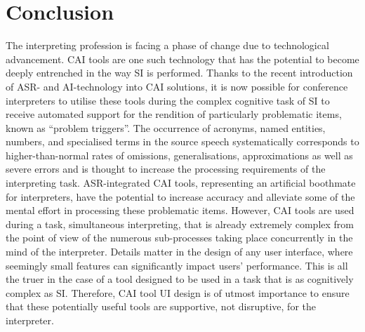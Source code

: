 \chapter{Conclusion}\label{ch:conclusion}
The interpreting profession is facing a phase of change due to technological advancement. CAI tools are one such technology that has the potential to become deeply entrenched in the way SI is performed. Thanks to the recent introduction of ASR- and AI-technology into CAI solutions, it is now possible for conference interpreters to utilise these tools during the complex cognitive task of SI to receive automated support for the rendition of particularly problematic items, known as ``problem triggers''. The occurrence of acronyms, named entities, numbers, and specialised terms in the source speech systematically corresponds to higher-than-normal rates of omissions, generalisations, approximations as well as severe errors and is thought to increase the processing requirements of the interpreting task. ASR-integrated CAI tools, representing an artificial boothmate for interpreters, have the potential to increase accuracy and alleviate some of the mental effort in processing these problematic items. However, CAI tools are used during a task, simultaneous interpreting, that is already extremely complex from the point of view of the numerous sub-processes taking place concurrently in the mind of the interpreter. Details matter in the design of any user interface, where seemingly small features can significantly impact users’ performance. This is all the truer in the case of a tool designed to be used in a task that is as cognitively complex as SI. Therefore, CAI tool UI design is of utmost importance to ensure that these potentially useful tools are supportive, not disruptive, for the interpreter. 

